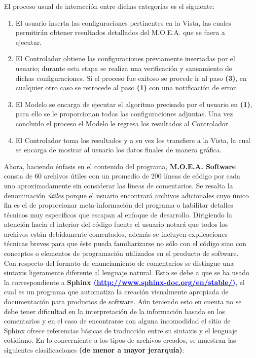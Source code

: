 \documentclass[12pt,twoside]{article}
\begin{document}
El proceso usual de interacción entre dichas categorías es el siguiente:

\begin{enumerate}
\item El usuario inserta las configuraciones pertinentes en la Vista, las cuales 
permitirán obtener resultados detallados del M.O.E.A. que se fuera a ejecutar.
\item El Controlador obtiene las configuraciones previamente insertadas por el 
usuario; durante esta etapa se realiza una verificación y saneamiento de dichas 
configuraciones. Si el proceso fue exitoso se procede ir al paso \textbf{(3)}, 
en cualquier otro caso se retrocede al paso \textbf{(1)} con una notificación de error.
\item El Modelo se encarga de ejecutar el algoritmo precisado por el usuario en 
\textbf{(1)}, para ello se le proporcionan todas las configuraciones adjuntas. 
Una vez concluido el proceso el Modelo le regresa los resultados al Controlador.
\item El Controlador toma los resultados y a su vez los transfiere a la Vista, 
la cual se encarga de mostrar al usuario los datos finales de manera gráfica.\medskip\break
\end{enumerate}

Ahora, haciendo énfasis en el contenido del programa, \textbf{M.O.E.A. Software} 
consta de 60 archivos útiles con un promedio de 200 líneas de código por cada 
uno aproximadamente sin considerar las líneas de comentarios.\break
Se resalta la denominación \textit{útiles} porque el usuario encontrará archivos 
adicionales cuyo único fin es el de proporcionar meta-información del programa 
o habilitar detalles técnicos muy específicos que escapan al enfoque de 
desarrollo.\medskip\break
Dirigiendo la atención hacia el interior del código fuente el usuario notará 
que todos los archivos están debidamente comentados, además se incluyen 
explicaciones técnicas breves para que éste pueda familiarizarse no sólo con el 
código sino con conceptos o elementos de programación utilizados en el 
producto de software.\medskip\break
Con respecto del formato de enunciamiento de comentarios se distingue una 
sintaxis ligeramente diferente al lenguaje natural. Esto se debe a que se ha usado 
la correspondiente a \break\textbf{Sphinx \href{http://www.sphinx-doc.org/en/stable/}{\textcolor{blue}{(http://www.sphinx-doc.org/en/stable/)}}}, 
el cual es un programa que automatiza la creación visualmente apropiada de 
documentación para productos de software.\break
Aún teniendo esto en cuenta no se debe tener dificultad en la interpretación de 
la información basada en los comentarios y en el caso de encontrarse con alguna 
incomodidad el sitio de Sphinx ofrece referencias básicas de traducción entre 
su sintaxis y el lenguaje cotidiano.\medskip\break
En lo concerniente a los tipos de archivos creados, se muestran las siguientes 
clasificaciones \textbf{(de menor a mayor jerarquía)}:
\end{document}
